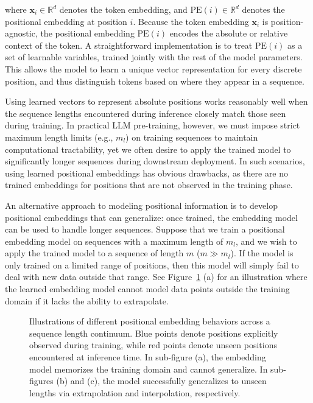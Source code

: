 \noindent where $\mathbf{x}_i \in \mathbb{R}^{d}$ denotes the token embedding, and $\mathrm{PE}(i) \in \mathbb{R}^{d}$ denotes the positional embedding at position $i$. Because the token embedding $\mathbf{x}_i$ is position-agnostic, the positional embedding $\mathrm{PE}(i)$ encodes the absolute or relative context of the token. A straightforward implementation is to treat $\mathrm{PE}(i)$ as a set of learnable variables, trained jointly with the rest of the model parameters. This allows the model to learn a unique vector representation for every discrete position, and thus distinguish tokens based on where they appear in a sequence.

Using learned vectors to represent absolute positions works reasonably well when the sequence lengths encountered during inference closely match those seen during training. In practical LLM pre-training, however, we must impose strict maximum length limits (e.g., $m_l$) on training sequences to maintain computational tractability, yet we often desire to apply the trained model to significantly longer sequences during downstream deployment. In such scenarios, using learned positional embeddings has obvious drawbacks, as there are no trained embeddings for positions that are not observed in the training phase.

An alternative approach to modeling positional information is to develop positional embeddings that can generalize: once trained, the embedding model can be used to handle longer sequences. Suppose that we train a positional embedding model on sequences with a maximum length of $m_l$, and we wish to apply the trained model to a sequence of length $m$ ($m \gg m_l$). If the model is only trained on a limited range of positions, then this model will simply fail to deal with new data outside that range. See Figure~\ref{fig:pe-for-a-range-of-positions} (a) for an illustration where the learned embedding model cannot model data points outside the training domain if it lacks the ability to extrapolate.

\begin{figure}[!t]
\centering

\caption{Illustrations of different positional embedding behaviors across a sequence length continuum. Blue points denote positions explicitly observed during training, while red points denote unseen positions encountered at inference time. In sub-figure (a), the embedding model memorizes the training domain and cannot generalize. In sub-figures (b) and (c), the model successfully generalizes to unseen lengths via extrapolation and interpolation, respectively.}
\label{fig:pe-for-a-range-of-positions}
\end{figure}

